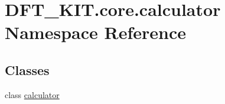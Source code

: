 \hypertarget{namespace_d_f_t___k_i_t_1_1core_1_1calculator}{\section{D\+F\+T\+\_\+\+K\+I\+T.\+core.\+calculator Namespace Reference}
\label{namespace_d_f_t___k_i_t_1_1core_1_1calculator}
}
\subsection*{Classes}
\begin{DoxyCompactItemize}
\item 
class \hyperlink{class_d_f_t___k_i_t_1_1core_1_1calculator_1_1calculator}{calculator}
\end{DoxyCompactItemize}
